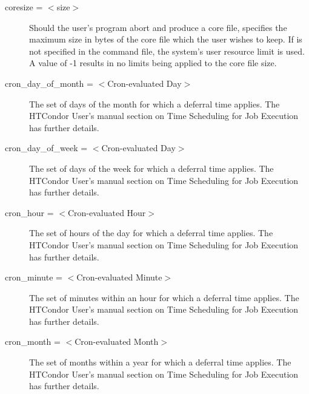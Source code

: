 \begin{description}

\label{condor-submit-coresize}
\item[coresize = $<$size$>$] Should the user's program abort and produce
a core file,  specifies the maximum size in bytes of the
core file which the user wishes to keep. If  is not
specified in the command file, the system's user resource limit
 is used.
A value of -1 results in no limits being applied to the core file size.

\label{condor-submit-cron-day-of-month}
\item[cron\_day\_of\_month = $<$Cron-evaluated Day$>$]
The set of days of the month for which a deferral time applies.
The HTCondor User's manual section on Time Scheduling for Job Execution
has further details.

\label{condor-submit-cron-day-of-week}
\item[cron\_day\_of\_week = $<$Cron-evaluated Day$>$]
The set of days of the week for which a deferral time applies.
The HTCondor User's manual section on Time Scheduling for Job Execution
has further details.

\label{condor-submit-cron-hour}
\item[cron\_hour = $<$Cron-evaluated Hour$>$]
The set of hours of the day for which a deferral time applies.
The HTCondor User's manual section on Time Scheduling for Job Execution
has further details.

\label{condor-submit-cron-minute}
\item[cron\_minute = $<$Cron-evaluated Minute$>$]
The set of minutes within an hour for which a deferral time applies.
The HTCondor User's manual section on Time Scheduling for Job Execution
has further details.

\label{condor-submit-cron-month}
\item[cron\_month = $<$Cron-evaluated Month$>$]
The set of months within a year for which a deferral time applies.
The HTCondor User's manual section on Time Scheduling for Job Execution
has further details.


\end{description}
